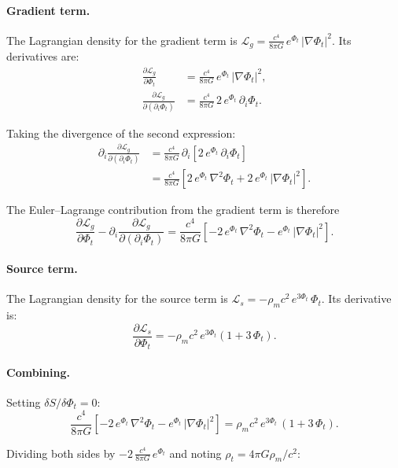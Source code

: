\documentclass[12pt]{article}
\begin{document}
\paragraph{Gradient term.}

The Lagrangian density for the gradient term is $\mathcal{L}_g = \frac{c^4}{8\pi G}\,e^{\Phi_t}\,|\nabla\Phi_t|^2$. Its derivatives are:
\begin{align*}
\frac{\partial \mathcal{L}_g}{\partial \Phi_t} &= \frac{c^4}{8\pi G}\,e^{\Phi_t}\,|\nabla\Phi_t|^2, \\[6pt]
\frac{\partial \mathcal{L}_g}{\partial(\partial_i\Phi_t)} &= \frac{c^4}{8\pi G}\,2\,e^{\Phi_t}\,\partial_i\Phi_t.
\end{align*}

Taking the divergence of the second expression:
\begin{align*}
\partial_i\frac{\partial \mathcal{L}_g}{\partial(\partial_i\Phi_t)} &= \frac{c^4}{8\pi G}\,\partial_i\!\left[2\,e^{\Phi_t}\,\partial_i\Phi_t\right] \\
&= \frac{c^4}{8\pi G}\left[2\,e^{\Phi_t}\,\nabla^2\Phi_t + 2\,e^{\Phi_t}\,|\nabla\Phi_t|^2\right].
\end{align*}

The Euler--Lagrange contribution from the gradient term is therefore
$$
\frac{\partial \mathcal{L}_g}{\partial \Phi_t} - \partial_i\frac{\partial \mathcal{L}_g}{\partial(\partial_i\Phi_t)}
= \frac{c^4}{8\pi G}\left[-2\,e^{\Phi_t}\,\nabla^2\Phi_t - e^{\Phi_t}\,|\nabla\Phi_t|^2\right].
$$

\paragraph{Source term.}

The Lagrangian density for the source term is $\mathcal{L}_s = -\rho_m c^2\,e^{3\Phi_t}\,\Phi_t$. Its derivative is:
$$
\frac{\partial \mathcal{L}_s}{\partial \Phi_t} = -\rho_m c^2\,e^{3\Phi_t}\left(1 + 3\,\Phi_t\right).
$$

\paragraph{Combining.}

Setting $\delta S / \delta\Phi_t = 0$:
$$
\frac{c^4}{8\pi G}\left[-2\,e^{\Phi_t}\,\nabla^2\Phi_t - e^{\Phi_t}\,|\nabla\Phi_t|^2\right]
= \rho_m c^2\,e^{3\Phi_t}\,(1 + 3\,\Phi_t).
$$

Dividing both sides by $-2\,\frac{c^4}{8\pi G}\,e^{\Phi_t}$ and noting $\rho_t = 4\pi G\rho_m/c^2$:
\end{document}
